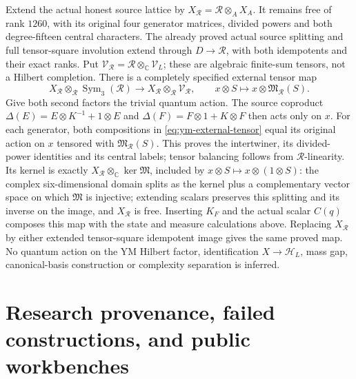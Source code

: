 Extend the actual honest source lattice by
$X_{\mathcal R}=\mathcal R\otimes_A X_A$.
It remains free of rank $1260$, with its original four generator
matrices, divided powers and both degree-fifteen central characters.
The already proved actual source splitting and full tensor-square
involution extend through $D\to\mathcal R$, with both idempotents
and their exact ranks. Put
$\mathscr V_{\mathcal R}=\mathcal R\otimes_{\mathbb C}\mathscr V_L$;
these are algebraic finite-sum tensors, not a Hilbert completion.
There is a completely specified external tensor map
\begin{equation}\label{eq:ym-external-tensor}
 X_{\mathcal R}\otimes_{\mathcal R}\operatorname{Sym}_3(\mathcal R)
 \longrightarrow X_{\mathcal R}\otimes_{\mathcal R}\mathscr V_{\mathcal R},
 \qquad x\otimes S\longmapsto x\otimes\mathfrak M_{\mathcal R}(S).
\end{equation}
Give both second factors the trivial quantum action. The source
coproduct
$\Delta(E)=E\otimes K^{-1}+1\otimes E$ and
$\Delta(F)=F\otimes1+K\otimes F$ then acts only on $x$.
For each generator, both compositions in
\eqref{eq:ym-external-tensor} equal its original action on $x$
tensored with $\mathfrak M_{\mathcal R}(S)$. This proves the
intertwiner, its divided-power identities and its central labels;
tensor balancing follows from $\mathcal R$-linearity.
Its kernel is exactly
$X_{\mathcal R}\otimes_{\mathbb C}\ker\mathfrak M$, included by
$x\otimes S\mapsto x\otimes(1\otimes S)$:
the complex six-dimensional domain splits as the kernel plus
a complementary vector space on which $\mathfrak M$ is
injective; extending scalars preserves this splitting and its
inverse on the image, and $X_{\mathcal R}$ is free.
Inserting $K_F$ and the actual scalar $C(q)$ composes this map
with the state and measure calculations above. Replacing
$X_{\mathcal R}$ by either extended tensor-square idempotent
image gives the same proved map. No quantum action on the YM
Hilbert factor, identification $X\to\mathscr H_L$, mass gap,
canonical-basis construction or complexity separation is inferred.

\section{Research provenance, failed constructions, and public workbenches}
\label{sec:research-provenance}

